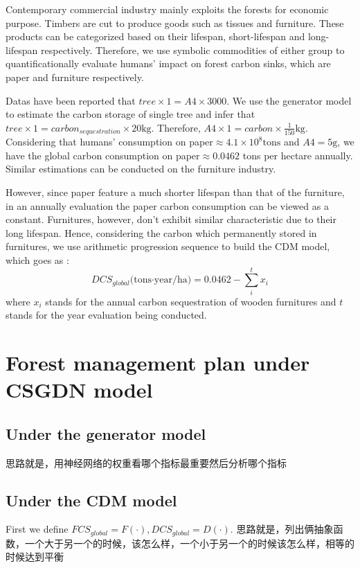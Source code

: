 \documentclass[12pt]{article}
\begin{document}
Contemporary commercial industry mainly exploits the forests for economic purpose. Timbers are cut to produce goods such as tissues and furniture. These products can be categorized based on their lifespan, short-lifespan and long-lifespan respectively. Therefore, we use symbolic commodities of either group to quantificationally evaluate humans' impact on forest carbon sinks, which are paper and furniture respectively.

Datas have been reported that $tree\times1 = A4\times 3000$. We use the generator model to estimate the carbon storage of single tree and infer that $tree\times 1=carbon_{sequestration}\times20 \text{kg} $. Therefore, $A4\times 1 =carbon\times \frac{1}{150} \text{kg}$. Considering that humans' consumption on paper$\approx 4.1\times10^8 \text{tons}$ and $A4=5\text{g}$, we have the global carbon consumption on paper$\approx 0.0462$ tons per hectare annually. Similar
estimations can be conducted on the furniture industry.

However, since paper feature a much shorter lifespan than that of the furniture, in an annually evaluation the paper carbon consumption can be viewed as a constant. Furnitures, however, don't exhibit similar characteristic due to their long lifespan. Hence, considering the carbon which permanently stored in furnitures, we use arithmetic progression sequence to build the CDM model, which goes as :
\begin{equation}
	DCS_{global}\text{(tons·year/ha)} = 0.0462 - \sum_{i}^{t}x_i 
\end{equation}
where $x_i$ stands for the annual carbon sequestration of wooden furnitures and $t$ stands for the year evaluation being conducted. 
\section{Forest management plan under CSGDN model}
\subsection{Under the generator model}
思路就是，用神经网络的权重看哪个指标最重要然后分析哪个指标
\subsection{Under the CDM model}
\hspace{2em} First we define $FCS_{global} = F(\cdot), DCS_{global} = D(\cdot)$. 
思路就是，列出俩抽象函数，一个大于另一个的时候，该怎么样，一个小于另一个的时候该怎么样，相等的时候达到平衡
\end{document}
